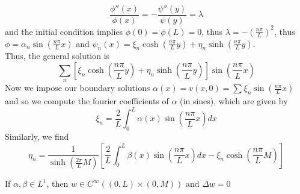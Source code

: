 \documentclass[../main.tex]{subfiles}
\begin{document}
\[ 
\frac{\phi''( x) }{\phi( x)} = - \frac{\psi''( y) }{\psi ( y) }= \lambda
\]
and the initial condition implies $ \phi( 0) = \phi( L)  = 0$, thus $ \lambda = - ( \frac{n \pi}{L}) ^{2}$, thus $\phi= \alpha_n \sin (  \frac{n \pi}{L} x) $ and $ \psi_n ( x) = \xi_n \cosh (  \frac{n \pi}{L}y) +  \eta_n \sinh(  \frac{n \pi }{L}y) $.\\
Thus, the general solution is
\[ 
\sum_n \left[ \xi_n \cosh(  \frac{n \pi}{L} y) + \eta_n \sinh(  \frac{n \pi}{L} y)  \right] \sin ( \frac{n \pi}{L}x) 
\]
Now we impose our boundary solutions $ \alpha( x) = v( x,0) = \sum_{}^{ }\xi_n \sin(  \frac{n \pi}{L} x) $ and so we compute the fourier coefficients of $\alpha$ (in sines), which are given by
\[ 
\xi_n = \frac{2}{L} \int_{ 0 }^{ L }  \alpha( x) \sin ( \frac{n \pi}{L}x) dx
\]
Similarly, we find
\[ 
\eta_n = \frac{1}{\sinh(  \frac{2\pi }{L}M) } \left[ \frac{2}{L }\int_{ 0 }^{ L }\beta( x) \sin( \frac{n \pi}{L}x) dx - \xi_n \cosh (  \frac{n \pi}{L}M) \right] 
\]
\begin{propo}
If $\alpha,\beta \in L^{1}$, then $ w \in C^{ \infty }( ( 0,L) \times ( 0,M) ) $ and $\Delta w=0$ 
\end{propo}
\end{document}
